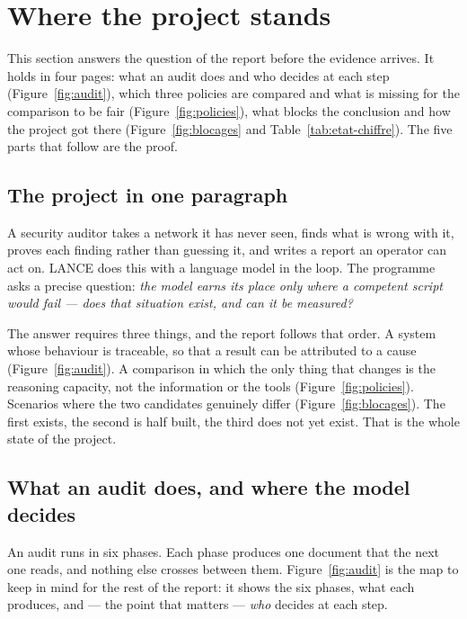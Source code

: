 \section{Where the project stands}
\label{sec:etat}

This section answers the question of the report before the evidence arrives. It
holds in four pages: what an audit does and who decides at each step
(Figure~\ref{fig:audit}), which three policies are compared and what is missing for
the comparison to be fair (Figure~\ref{fig:policies}), what blocks the conclusion and how the project got there
(Figure~\ref{fig:blocages} and Table~\ref{tab:etat-chiffre}). The five parts that follow are the proof.

\subsection{The project in one paragraph}

A security auditor takes a network it has never seen, finds what is wrong with it,
proves each finding rather than guessing it, and writes a report an operator can
act on. LANCE does this with a language model in the loop. The programme asks a
precise question: \emph{the model earns its place only where a competent script
would fail --- does that situation exist, and can it be measured?}

The answer requires three things, and the report follows that order. A system
whose behaviour is traceable, so that a result can be attributed to a cause
(Figure~\ref{fig:audit}). A comparison in which the only thing that changes is the
reasoning capacity, not the information or the tools
(Figure~\ref{fig:policies}). Scenarios where the two candidates genuinely differ
(Figure~\ref{fig:blocages}). The first exists, the second is half built, the third
does not yet exist. That is the whole state of the project.

\subsection{What an audit does, and where the model decides}
\label{sec:parcours}

An audit runs in six phases. Each phase produces one document that the next one
reads, and nothing else crosses between them. Figure~\ref{fig:audit} is the map to
keep in mind for the rest of the report: it shows the six phases, what each
produces, and --- the point that matters --- \emph{who} decides at each step.

